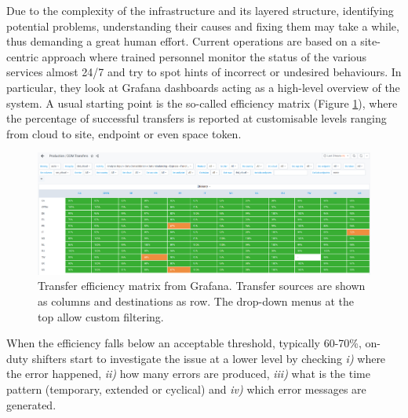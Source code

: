 Due to the complexity of the infrastructure and its layered structure, identifying potential problems, understanding their causes and fixing them may take a while, thus demanding a great human effort.
Current operations are based on a site-centric approach where trained personnel monitor the status of the various services almost 24/7 and try to spot hints of incorrect or undesired behaviours. In particular, they look at Grafana dashboards acting as a high-level overview of the system. A usual starting point is the so-called efficiency matrix (Figure \ref{fig:efficiency_matrix}), where the percentage of successful transfers is reported at customisable levels ranging from cloud to site, endpoint or even space token.
\begin{figure}
    \centering
    \includegraphics[width=\textwidth]{figures/220_introduction/efficiency_matrix.png}
    \caption{Transfer efficiency matrix from Grafana. Transfer sources are shown as columns and destinations as row. The drop-down menus at the top allow custom filtering.}
    \label{fig:efficiency_matrix}
\end{figure}
When the efficiency falls below an acceptable threshold, typically 60-70\%, on-duty shifters start to investigate the issue at a lower level by checking \emph{i)} where the error happened, \emph{ii)} how many errors are produced, \emph{iii)} what is the time pattern (temporary, extended or cyclical) and \emph{iv)} which error messages are generated. 
